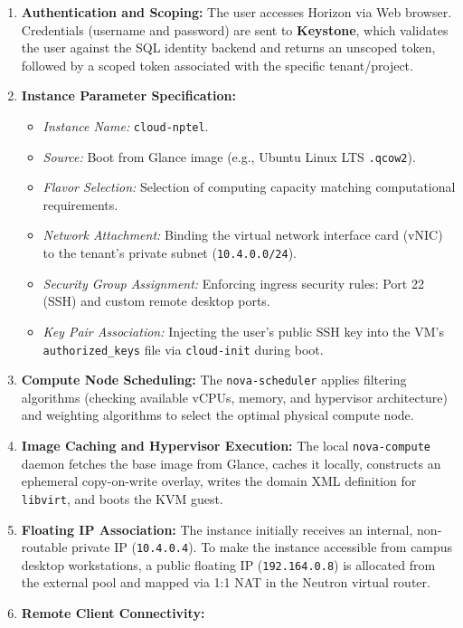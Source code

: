 \begin{enumerate}[leftmargin=*]
  \item \textbf{Authentication and Scoping:} The user accesses Horizon via Web browser. Credentials (username and password) are sent to \textbf{Keystone}, which validates the user against the SQL identity backend and returns an unscoped token, followed by a scoped token associated with the specific tenant/project.
  \item \textbf{Instance Parameter Specification:}
    \begin{itemize}
      \item \emph{Instance Name:} \texttt{cloud-nptel}.
      \item \emph{Source:} Boot from Glance image (e.g., Ubuntu Linux LTS \texttt{.qcow2}).
      \item \emph{Flavor Selection:} Selection of computing capacity matching computational requirements.
      \item \emph{Network Attachment:} Binding the virtual network interface card (vNIC) to the tenant's private subnet (\texttt{10.4.0.0/24}).
      \item \emph{Security Group Assignment:} Enforcing ingress security rules: Port 22 (SSH) and custom remote desktop ports.
      \item \emph{Key Pair Association:} Injecting the user's public SSH key into the VM's \texttt{authorized\_keys} file via \texttt{cloud-init} during boot.
    \end{itemize}
  \item \textbf{Compute Node Scheduling:} The \texttt{nova-scheduler} applies filtering algorithms (checking available vCPUs, memory, and hypervisor architecture) and weighting algorithms to select the optimal physical compute node.
  \item \textbf{Image Caching and Hypervisor Execution:} The local \texttt{nova-compute} daemon fetches the base image from Glance, caches it locally, constructs an ephemeral copy-on-write overlay, writes the domain XML definition for \texttt{libvirt}, and boots the KVM guest.
  \item \textbf{Floating IP Association:} The instance initially receives an internal, non-routable private IP (\texttt{10.4.0.4}). To make the instance accessible from campus desktop workstations, a public floating IP (\texttt{192.164.0.8}) is allocated from the external pool and mapped via 1:1 NAT in the Neutron virtual router.
  \item \textbf{Remote Client Connectivity:}

\end{enumerate}

